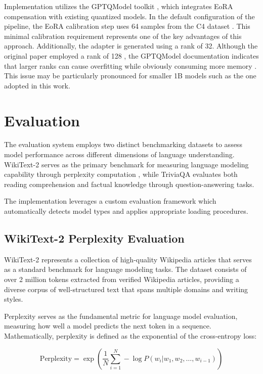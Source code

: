 Implementation utilizes the GPTQModel toolkit \cite{gptqmodel}, which integrates EoRA compensation with existing quantized models. In the default configuration of the pipeline, the EoRA calibration step uses 64 samples from the C4 dataset \cite{c4}. This minimal calibration requirement represents one of the key advantages of this approach. Additionally, the adapter is generated using a rank of 32. Although the original paper employed a rank of 128 \cite{eora}, the GPTQModel documentation indicates that larger ranks can cause overfitting while obviously consuming more memory \cite{gptqmodel}. This issue may be particularly pronounced for smaller 1B models such as the one adopted in this work.


\section{Evaluation} \label{evaluation}

The evaluation system employs two distinct benchmarking datasets to assess model performance across different dimensions of language understanding. WikiText-2 \cite{wikitext} serves as the primary benchmark for measuring language modeling capability through perplexity computation \cite{perplexity}, while TriviaQA \cite{triviaqa} evaluates both reading comprehension and factual knowledge through question-answering tasks.

The implementation leverages a custom evaluation framework which automatically detects model types and applies appropriate loading procedures.

\subsection{WikiText-2 Perplexity Evaluation}

WikiText-2 \cite{wikitext} represents a collection of high-quality Wikipedia articles that serves as a standard benchmark for language modeling tasks. The dataset consists of over 2 million tokens extracted from verified Wikipedia articles, providing a diverse corpus of well-structured text that spans multiple domains and writing styles.

Perplexity serves as the fundamental metric for language model evaluation, measuring how well a model predicts the next token in a sequence. Mathematically, perplexity is defined as the exponential of the cross-entropy loss:

\begin{equation}
\text{Perplexity} = \exp\left(\frac{1}{N} \sum_{i=1}^{N} -\log P(w_i | w_1, w_2, \ldots, w_{i-1})\right)
\end{equation}

